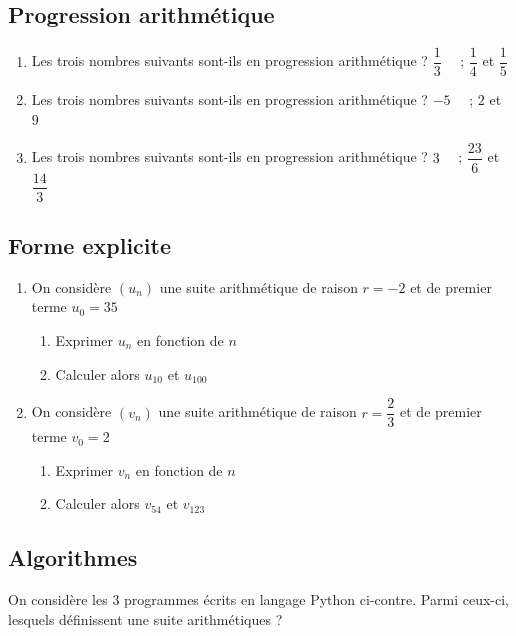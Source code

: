 \documentclass[oneside,12pt]{article}          %
\begin{document}
\subsection{Progression arithmétique}
\begin{enumerate}
	\item Les trois nombres suivants sont-ils en progression arithmétique ? \quad $\dfrac{1}{3} \quad$ ; \quad $\dfrac{1}{4}$ \quad et \quad $\dfrac{1}{5}$
	\item Les trois nombres suivants sont-ils en progression arithmétique ? \quad $-5 \quad$ ; \quad $2$ \quad et \quad $9$
	\item Les trois nombres suivants sont-ils en progression arithmétique ? \quad $3 \quad$ ; \quad $\dfrac{23}{6}$ \quad et \quad $\dfrac{14}{3}$
\end{enumerate}



\subsection{Forme explicite}
\begin{enumerate}
	\item On considère $(u_n)$ une suite arithmétique de raison $r = -2$ et de premier terme $u_0 = 35$
	\begin{enumerate}
		\item Exprimer $u_n$ en fonction de $n$
		\item Calculer alors $u_{10}$ et $u_{100}$
	\end{enumerate}
	\item On considère $(v_n)$ une suite arithmétique de raison $r = \dfrac{2}{3}$ et de premier terme $v_0 = 2$
	\begin{enumerate}
		\item Exprimer $v_n$ en fonction de $n$
		\item Calculer alors $v_{54}$ et $v_{123}$
	\end{enumerate}
\end{enumerate}



\subsection{Algorithmes}
On considère les 3 programmes écrits en langage Python ci-contre. Parmi ceux-ci, lesquels définissent une suite arithmétiques ?
\end{document}

